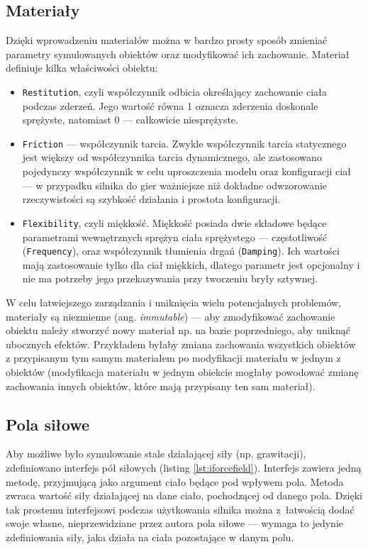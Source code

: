 \subsection{Materiały}
Dzięki wprowadzeniu materiałów można w bardzo prosty sposób zmieniać parametry symulowanych obiektów oraz modyfikować ich zachowanie. Materiał definiuje kilka właściwości obiektu:
\begin{itemize}
	\item \verb|Restitution|, czyli współczynnik odbicia określający zachowanie ciała podczas zderzeń. Jego wartość równa 1 oznacza zderzenia doskonale sprężyste, natomiast 0 --- całkowicie niesprężyste.
	\item \verb|Friction| --- współczynnik tarcia. Zwykle współczynnik tarcia statycznego jest większy od współczynnika tarcia dynamicznego, ale zastosowano pojedynczy współczynnik w celu uproszczenia modelu oraz konfiguracji ciał --- w przypadku silnika do gier ważniejsze niż dokładne odwzorowanie rzeczywistości są szybkość działania i prostota konfiguracji. 
	\item \verb|Flexibility|, czyli miękkość. Miękkość posiada dwie składowe będące parametrami wewnętrznych sprężyn ciała sprężystego --- częstotliwość (\verb|Frequency|), oraz współczynnik tłumienia drgań (\verb|Damping|). Ich wartości mają zastosowanie tylko dla ciał miękkich, dlatego parametr jest opcjonalny i nie ma potrzeby jego przekazywania przy tworzeniu bryły sztywnej.
\end{itemize}

W celu łatwiejszego zarządzania i uniknięcia wielu potencjalnych problemów, materiały są niezmienne (ang. \textit{immutable}) --- aby zmodyfikować zachowanie obiektu należy stworzyć nowy materiał np. na bazie poprzedniego, aby uniknąć ubocznych efektów. Przykładem byłaby zmiana zachowania wszystkich obiektów z przypisanym tym samym materiałem po modyfikacji materiału w jednym z obiektów (modyfikacja materiału w jednym obiekcie mogłaby powodować zmianę zachowania innych obiektów, które mają przypisany ten sam materiał).



\subsection{Pola siłowe} \label{cha:polasilowe}
Aby możliwe było symulowanie stale działającej siły (np. grawitacji), zdefiniowano interfejs pół siłowych (listing \ref{lst:iforcefield}). Interfejs zawiera jedną metodę, przyjmującą jako argument ciało będące pod wpływem pola. Metoda zwraca wartość siły działającej na dane ciało, pochodzącej od danego pola. Dzięki tak prostemu interfejsowi podczas użytkowania silnika można z~łatwością dodać swoje własne, nieprzewidziane przez autora pola siłowe --- wymaga to jedynie zdefiniowania siły, jaka działa na ciała pozostające w danym polu.

